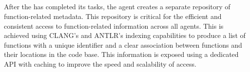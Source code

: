 \subsection{\indexer}
After the \analyzer has completed its tasks, the \indexer agent creates a separate repository of function-related metadata.
This repository is critical for the efficient and consistent access to function-related information across all agents.
This is achieved using CLANG's and ANTLR's indexing capabilities to produce a list of functions with a unique identifier and a clear association between functions and their locations in the code base.
This information is exposed using a dedicated API with caching to improve the speed and scalability of access.







